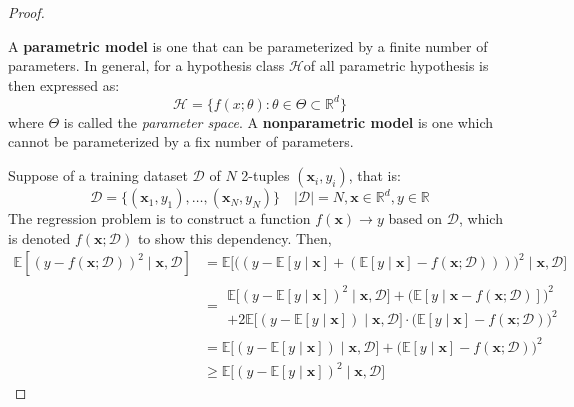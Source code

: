 \begin{proof}
    \begin{definition}[Parameterization]
        A \textbf{parametric model} is one that can be parameterized by a finite number of parameters. In general, for a hypothesis class $\mathcal{H}$of all parametric hypothesis is then expressed as:
        \begin{equation}
            \mathcal{H} = \{f(x;\theta): \theta \in \Theta \subset \mathbb{R}^{d}\}
        \end{equation} where $\Theta$ is called the \textit{parameter space}. A \textbf{nonparametric model} is one which cannot be parameterized by a fix number of parameters.   
    \end{definition}
    Suppose of a training dataset $\mathcal{D}$ of $N$ 2-tuples $(\mathbf{x}_{i},y_{i})$, that is: \begin{equation}
        \mathcal{D} = \{(\mathbf{x}_{1},y_{1}),\dots,(\mathbf{x}_{N},y_{N})\} \quad \lvert \mathcal{D} \rvert = N, \mathbf{x}\in \mathbb{R}^{d}, y \in \mathbb{R}
    \end{equation}
    The regression problem is to construct a function $f(\mathbf{x})\to y$ based on $\mathcal{D}$, which is denoted $f(\mathbf{x};\mathcal{D})$ to show this dependency. Then, 
    \begin{equation}
        \begin{split}
            \mathbb{E}\left[ (y-f(\mathbf{x};\mathcal{D}))^{2}\mid \mathbf{x},\mathcal{D}\right] & = \mathbb{E}\Big[\big( (y-\mathbb{E}[y\mid \mathbf{x}]+ (\mathbb{E}[y\mid \mathbf{x}]-f(\mathbf{x};\mathcal{D}))) \big)^{2}\mid \mathbf{x},\mathcal{D}\Big]\\
            & = \begin{multlined}
                \mathbb{E} \Big[ (y- \mathbb{E}[y\mid \mathbf{x}])^{2}\mid \mathbf{x},\mathcal{D} \Big] + \Big(\mathbb{E}[y\mid \mathbf{x}-f(\mathbf{x};\mathcal{D})]\Big)^{2} \\ + 2\mathbb{E} \big[(y-\mathbb{E}[y\mid \mathbf{x}])\mid \mathbf{x},\mathcal{D}\big]\cdot \big(\mathbb{E}[y\mid \mathbf{x}]-f(\mathbf{x;\mathcal{D}})\big)^{2} 
            \end{multlined} \\
            & = \mathbb{E} \Big[(y-\mathbb{E}[y\mid \mathbf{x}])\mid \mathbf{x},\mathcal{D}\Big] + \big(\mathbb{E}[y\mid \mathbf{x}]-f(\mathbf{x};\mathcal{D})\big)^{2}\\
            & \geq \mathbb{E} \big[(y-\mathbb{E}[y\mid \mathbf{x}])^{2}\mid \mathbf{x},\mathcal{D}\big]
        \end{split}

\end{equation}
\end{proof}
